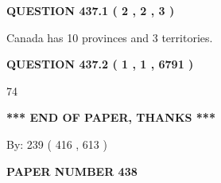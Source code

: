 \documentclass[12pt]{article}
\begin{document}
   
   
   
 \vspace{0.2in}
 
 
 
 
   
   
  
\vspace{0.2in}
  
{\textbf{\Large{QUESTION
437.1 
 ( 2 , 2 , 3 )
}}}
  
  
 
 
\noindent{}
 
 
Canada has 10  provinces and 3 territories.
 
 
 
 
  
\vspace{0.2in}
  
{\textbf{\Large{QUESTION
437.2 
 ( 1 , 1 , 6791 )
}}}
  
  
 
 
\noindent{}

74
 
 
   
   
 \vspace{0.2in}
 
   
   
   
   
\vspace{1.0in} 
{\textbf{\large{ *** END OF PAPER, THANKS *** }}} 
   
   
\hspace{1.0in} By: 
 239 ( 416 ,  613 )
   
   
   
   
\newpage 
\setcounter{page}{ 
   438001 } 
   
   
   
   
 {\textbf{ \Large{ PAPER NUMBER  438  }}}
   
   
\vspace{0.2in}
   
   
   
   
   
   
 \vspace{0.2in}
 
 
 
 
   
\end{document}

